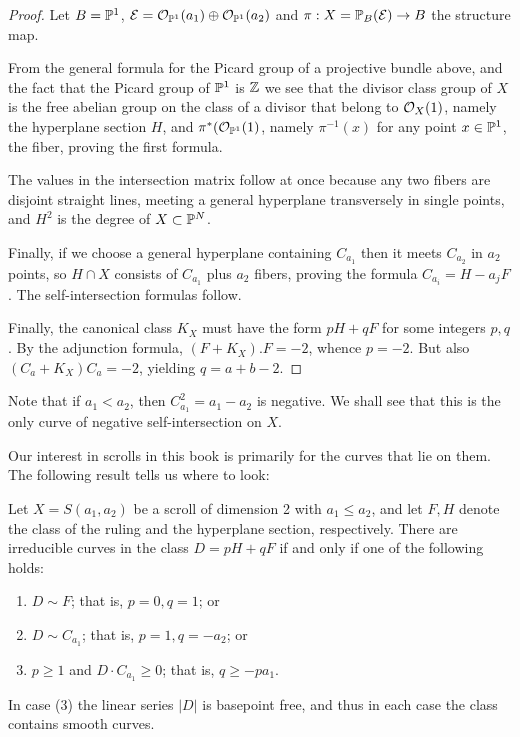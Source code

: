 \begin{proof} Let $B= \PP^{1}$, $\sE = \sO_{\PP^{1}}(a_{1}) \oplus \sO_{\PP^{1}}(a_{2})$ and  $\pi: X = \PP_{B}(\sE) \to B$ the structure map.

 From the general formula for the Picard group of a projective bundle above, and the fact that the Picard group of
 $\PP^{1}$ is $\ZZ$ we see that the divisor class group of $X$ is the free abelian group on the class of a divisor that belong to $\sO_{X}(1)$, namely the hyperplane section $H$, and $\pi^{*}(\sO_{\PP^{1}}(1)$, namely
 $\pi^{-1}(x)$ for any point $x\in \PP^{1}$, the fiber, proving the first formula.

The values in the intersection matrix follow at once because any two fibers are disjoint straight lines, meeting
a general hyperplane transversely in single points, and $H^{2}$ is the degree of $X\subset \PP^{N}$.

Finally, if we choose a general hyperplane containing $C_{a_{1}}$ then it meets $C_{a_2}$ in $a_{2}$ points,
so $H\cap X$ consists of $C_{a_{1}}$ plus $a_{2}$ fibers, proving the formula $C_{a_{i}} = H-a_{j}F$.
The self-intersection formulas follow. 

Finally, the canonical class $K_{X}$ must have the form $pH+qF$ for some integers $p,q$. By the adjunction formula,
$(F+K_{X}).F = -2$, whence $p=-2$. But also $(C_{a}+K_{X})C_{a} = -2$, yielding $q = a+b-2$.
\end{proof}

Note that if $a_{1}<a_{2}$, then $C_{a_{1}}^{2} = a_{1}-a_{2}$ is negative. We shall see that this is the only curve of negative self-intersection on $X$.

Our interest in scrolls in this book is primarily for the curves that lie on them. The following result tells us where to look:

\begin{theorem}\label{where are the curves?}
 Let $X = S(a_{1}, a_{2})$ be a scroll of dimension 2 with $a_{1}\leq a_{2}$, and let $F,H$ denote the class of the ruling and the hyperplane section, respectively. There are irreducible curves in the class $D = pH+qF$ if and only if one of the following holds:
\begin{enumerate}
\item $D\sim F$; that is, $p=0, q=1$; or
 \item $D\sim C_{a_{1}}$; that is, $p=1, q=-a_{2}$; or
 \item $p\geq 1$ and $D\cdot C_{a_{1}}\geq 0$; that is, $q \geq -pa_{1}.$
\end{enumerate}
In case (3) the linear series $|D|$ is basepoint free, and thus in each case the class contains smooth curves.
\end{theorem}

